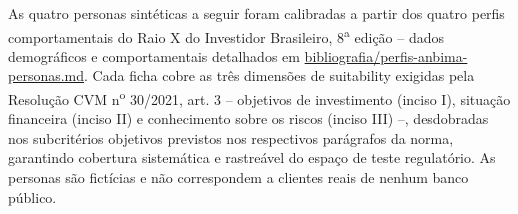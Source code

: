 \label{ane:personas}

As quatro personas sint\'eticas a seguir foram calibradas a partir dos
quatro perfis comportamentais do Raio X do Investidor Brasileiro,
8\textsuperscript{a} edi\c{c}\~ao \autocite{anbima2025} -- dados
demogr\'aficos e comportamentais detalhados em
\url{bibliografia/perfis-anbima-personas.md}. Cada ficha cobre as
tr\^es dimens\~oes de suitability exigidas pela Resolu\c{c}\~ao CVM
n\textsuperscript{o} 30/2021, art. 3\textordmasculine{} -- objetivos de
investimento (inciso I), situa\c{c}\~ao financeira (inciso II) e
conhecimento sobre os riscos (inciso III) --, desdobradas nos
subcrit\'erios objetivos previstos nos respectivos par\'agrafos da
norma, garantindo cobertura sistem\'atica e rastre\'avel do espa\c{c}o
de teste regulat\'orio. As personas s\~ao fict\'icias e n\~ao
correspondem a clientes reais de nenhum banco p\'ublico.


